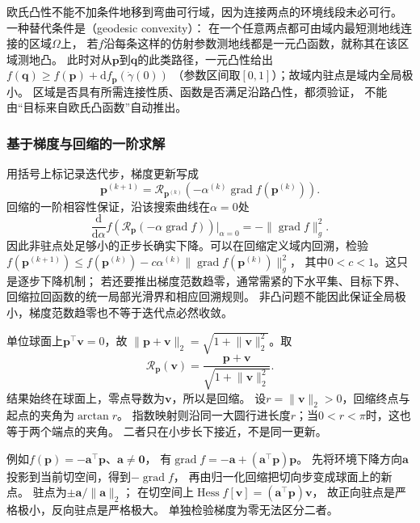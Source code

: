欧氏凸性不能不加条件地移到弯曲可行域，因为连接两点的环境线段未必可行。
一种替代条件是（geodesic convexity）：
在一个任意两点都可由域内最短测地线连接的区域$\Omega$上，
若$f$沿每条这样的仿射参数测地线都是一元凸函数，就称其在该区域测地凸。
此时对从$\bm p$到$\bm q$的此类路径，一元凸性给出
$f(\bm q)\geq f(\bm p)+\mathrm df_{\bm p}(\dot\gamma(0))$
（参数区间取$[0,1]$）；故域内驻点是域内全局极小。
区域是否具有所需连接性质、函数是否满足沿路凸性，都须验证，
不能由“目标来自欧氏凸函数”自动推出。

\subsubsection{基于梯度与回缩的一阶求解}
\label{sec:geometry-riemannian-gradient-method}

用括号上标记录迭代步，梯度更新写成
\begin{equation}
 \bm p^{(k+1)}=\mathcal R_{\bm p^{(k)}}
       (-\alpha^{(k)}\operatorname{grad}f(\bm p^{(k)})).
 \label{eq:geometry-riemannian-gradient-step}
\end{equation}
回缩的一阶相容性保证，沿该搜索曲线在$\alpha=0$处
\[
 \frac{\mathrm d}{\mathrm d\alpha}
 f(\mathcal R_{\bm p}(-\alpha\operatorname{grad}f))
 \bigg|_{\alpha=0}=-\lVert\operatorname{grad}f\rVert_g^2.
\]
因此非驻点处足够小的正步长确实下降。可以在回缩定义域内回溯，检验
$f(\bm p^{(k+1)})\leq f(\bm p^{(k)})
-c\alpha^{(k)}\lVert\operatorname{grad}f(\bm p^{(k)})\rVert_g^2$，
其中$0<c<1$。这只是逐步下降机制；
若还要推出梯度范数趋零，通常需紧的下水平集、目标下界、
回缩拉回函数的统一局部光滑界和相应回溯规则。
非凸问题不能因此保证全局极小，梯度范数趋零也不等于迭代点必然收敛。

\begin{example}[球面上的归一化更新]
\label{ex:geometry-sphere-retraction}
单位球面上$\bm p^\top\bm v=0$，故
$\lVert\bm p+\bm v\rVert_2=\sqrt{1+\lVert\bm v\rVert_2^2}$。取
\begin{equation}
 \mathcal R_{\bm p}(\bm v)
 =\frac{\bm p+\bm v}{\sqrt{1+\lVert\bm v\rVert_2^2}}.
 \label{eq:geometry-sphere-retraction}
\end{equation}
结果始终在球面上，零点导数为$\bm v$，所以是回缩。
设$r=\lVert\bm v\rVert_2>0$，回缩终点与起点的夹角为$\arctan r$。
指数映射则沿同一大圆行进长度$r$；当$0<r<\pi$时，这也等于两个端点的夹角。
二者只在小步长下接近，不是同一更新。

例如$f(\bm p)=-\bm a^\top\bm p$、$\bm a\neq\bm0$，
有$\operatorname{grad}f=-\bm a+(\bm a^\top\bm p)\bm p$。
先将环境下降方向$\bm a$投影到当前切空间，得到$-\operatorname{grad}f$，
再由归一化回缩把切向步变成球面上的新点。
驻点为$\pm\bm a/\lVert\bm a\rVert_2$；
在切空间上$\operatorname{Hess}f[\bm v]=(\bm a^\top\bm p)\bm v$，
故正向驻点是严格极小，反向驻点是严格极大。
单独检验梯度为零无法区分二者。
\end{example}

